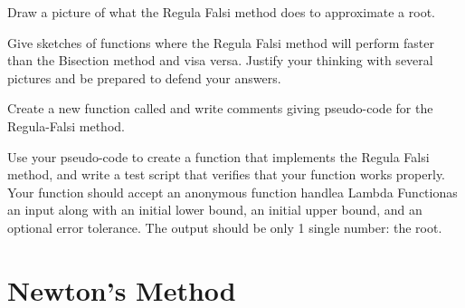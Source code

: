 \begin{problem}
    Draw a picture of what the Regula Falsi method does to approximate a root.
\end{problem}


\begin{problem}
    Give sketches of functions where the Regula Falsi method will perform faster than the
    Bisection method and visa versa.  Justify your thinking with several pictures and be
    prepared to defend your answers.
\end{problem}

\begin{problem}
    Create a new \ProgLang function called  and write comments giving
    pseudo-code for the Regula-Falsi method.
\end{problem}

\begin{problem}
   Use your pseudo-code to create a \ProgLang function that implements the Regula Falsi method, and write a test script
   that verifies that your function works properly. Your function should accept 
   \ifnum{} an anonymous function
    handle\else a Lambda Function\fi as an input along with an initial lower bound, an initial
    upper bound, and an optional error tolerance. The output should be only 1 single number: the
    root.\\
    \ifnum{} 
    \else
    \fi
\end{problem}



\newpage\section{Newton's Method}

